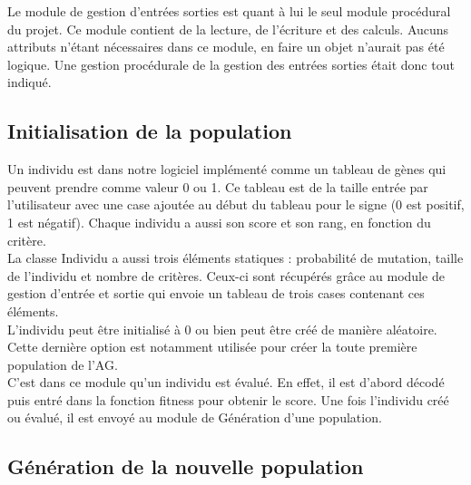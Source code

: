 \documentclass[a4paper,11pt]{article}
\begin{document}
		Le module de gestion d’entrées sorties est quant à lui le seul module procédural du projet. Ce module contient de la lecture, de l’écriture et des calculs. Aucuns attributs n'étant nécessaires dans ce module, en faire un objet n'aurait pas été logique. Une gestion procédurale de la gestion des entrées sorties était donc tout indiqué. \\
		
		\subsection{Initialisation de la population}
			Un individu est dans notre logiciel implémenté comme un tableau de gènes qui peuvent prendre comme valeur 0 ou 1.
			Ce tableau est de la taille entrée par l’utilisateur avec une case ajoutée au début du tableau pour le signe (0 est positif, 1 est négatif).
			Chaque individu a aussi son score et son rang, en fonction du critère.\\
			La classe Individu a aussi trois éléments statiques : probabilité de mutation, taille de l’individu et nombre de critères.
			Ceux-ci sont récupérés grâce au module de gestion d’entrée et sortie qui envoie un tableau de trois cases contenant ces éléments.\\
			L’individu peut être initialisé à 0 ou bien peut être créé de manière aléatoire. Cette dernière option est notamment utilisée pour créer la toute première population de l’AG.\\
			C’est dans ce module qu’un individu est évalué.
			En effet, il est d’abord décodé puis entré dans la fonction fitness pour obtenir le score.
			Une fois l’individu créé ou évalué, il est envoyé au module de Génération d’une population.
		
		\subsection{Génération de la nouvelle population}
		
\end{document}
